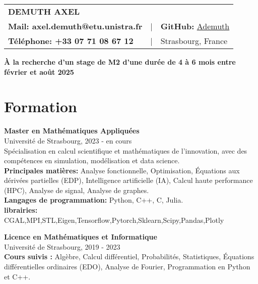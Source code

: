 \documentclass[a4paper,10pt]{article}
\begin{document}
\begin{center}
    \begin{tabular}{>{\bfseries}l c l}
        \textbf{\LARGE DEMUTH AXEL} & & \\[0.3cm]
        \textbf{Mail:} axel.demuth@etu.unistra.fr & | & \textbf{GitHub:} \href{https://github.com/InfmathAxel}{Ademuth} \\ [0.1cm]
        \textbf{Téléphone:} +33 07 71 08 67 12 & | & Strasbourg, France
    \end{tabular}
\end{center}

\vspace{0.5cm}

\begin{center}
    \textbf{À la recherche d'un stage de M2 d'une durée de 4 à 6 mois entre février et août 2025}
\end{center}

\vspace{0.5cm}

\section*{Formation}
\noindent
\textbf{Master en Mathématiques Appliquées} \\
Université de Strasbourg, 2023 - en cours \\
Spécialisation en calcul scientifique et mathématiques de l'innovation, avec des compétences en simulation, modélisation et data science. \\

\noindent
\textbf{Principales matières:} Analyse fonctionnelle, Optimisation, Équations aux dérivées partielles (EDP), Intelligence artificielle (IA), Calcul haute performance (HPC), Analyse de signal, Analyse de graphes. \\

\noindent
\textbf{Langages de programmation:} Python, C++, C, Julia. \\
\textbf{librairies:} CGAL,MPI,STL,Eigen,Tensorflow,Pytorch,Sklearn,Scipy,Pandas,Plotly
\vspace{0.2cm} 
\vspace{0.1cm}

\noindent
\textbf{Licence en Mathématiques et Informatique} \\
Université de Strasbourg, 2019 - 2023 \\
\noindent
\textbf{Cours suivis :} Algèbre, Calcul différentiel, Probabilités, Statistiques, Équations différentielles ordinaires (EDO), Analyse de Fourier, Programmation en Python et C++. \\
\end{document}
